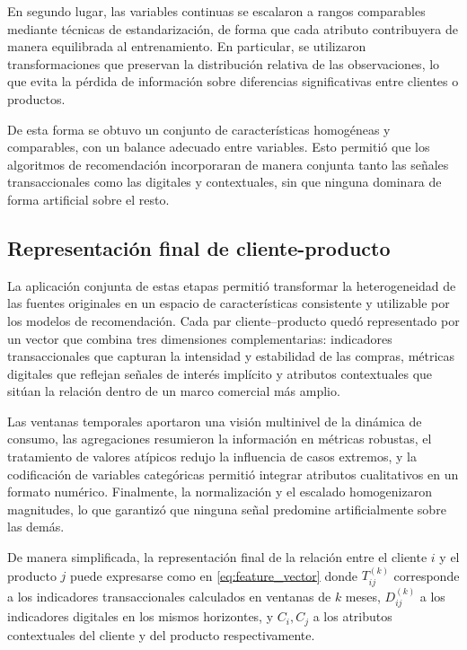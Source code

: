 En segundo lugar, las variables continuas se escalaron a rangos comparables mediante técnicas de estandarización, de forma que cada atributo contribuyera de manera equilibrada al entrenamiento. En particular, se utilizaron transformaciones que preservan la distribución relativa de las observaciones, lo que evita la pérdida de información sobre diferencias significativas entre clientes o productos.

De esta forma se obtuvo un conjunto de características homogéneas y comparables, con un balance adecuado entre variables. Esto permitió que los algoritmos de recomendación incorporaran de manera conjunta tanto las señales transaccionales como las digitales y contextuales, sin que ninguna dominara de forma artificial sobre el resto.

\subsection{Representación final de cliente-producto}

La aplicación conjunta de estas etapas permitió transformar la heterogeneidad de las fuentes originales en un espacio de características consistente y utilizable por los modelos de recomendación. Cada par cliente–producto quedó representado por un vector que combina tres dimensiones complementarias: indicadores transaccionales que capturan la intensidad y estabilidad de las compras, métricas digitales que reflejan señales de interés implícito y atributos contextuales que sitúan la relación dentro de un marco comercial más amplio.  

Las ventanas temporales aportaron una visión multinivel de la dinámica de consumo, las agregaciones resumieron la información en métricas robustas, el tratamiento de valores atípicos redujo la influencia de casos extremos, y la codificación de variables categóricas permitió integrar atributos cualitativos en un formato numérico. Finalmente, la normalización y el escalado homogenizaron magnitudes, lo que garantizó que ninguna señal predomine artificialmente sobre las demás.

De manera simplificada, la representación final de la relación entre el cliente $i$ y el producto $j$ puede expresarse como en \ref{eq:feature_vector} donde $T_{ij}^{(k)}$ corresponde a los indicadores transaccionales calculados en ventanas de $k$ meses, $D_{ij}^{(k)}$ a los indicadores digitales en los mismos horizontes, y $C_i, C_j$ a los atributos contextuales del cliente y del producto respectivamente.  

